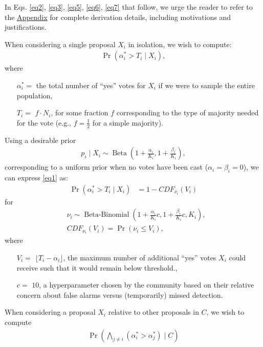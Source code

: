 \documentclass[format=acmsmall, review=true, screen=true, anonymous=true]{acmart}
\begin{document}
In Eqs. \eqref{eq2}, \eqref{eq3}, \eqref{eq5}, \eqref{eq6}, \eqref{eq7} that follow, we urge the reader to refer to the \hyperref[sec:derivation]{Appendix} for complete derivation details, including motivations and justifications.

When considering a single proposal $X_i$ in isolation, we wish to compute:
\begin{align}\label{eq1}
\Pr(\alpha^*_i > T_i \mid X_i),
\end{align}
where
\begin{itemize}
\item[$\alpha^*_i = $] the total number of ``yes'' votes for $X_i$ if we were to sample the entire population,
\item[$T_i = $] $f \cdot N_i$, for some fraction $f$ corresponding to the type of majority needed for the vote
(e.g., $f=\frac{1}{2}$ for a simple majority).
\end{itemize}
Using a desirable prior
\begin{align}\label{eq2}
p_i \mid X_i \sim \operatorname{Beta}(1+\frac{\alpha_i}{K_i},1+\frac{\beta_i}{K_i}),
\end{align}
corresponding to a uniform prior when no votes have been cast ($\alpha_i = \beta_i = 0$), we can express \eqref{eq1} as:
\begin{align}\label{eq3}
\Pr(\alpha^*_i > T_i \mid X_i) &= 1 - {CDF}_{\nu_i}(V_i)
\end{align}
for
\begin{align*}
&\nu_i \sim \operatorname{Beta-Binomial}(1 + \frac{\alpha_i}{K_i}c, 1 + \frac{\beta_i}{K_i}c, K_i),\\
&{CDF}_{\nu_i}(V_i)  = \Pr(\nu_i \leq V_i),
\end{align*}
where
\begin{itemize}
\item[$V_i = $] $\lfloor{T_i - \alpha_i}\rfloor$, the maximum number of additional ``yes'' votes $X_i$ could receive such that it would remain below threshold.,
\item[$c = $] $10$, a hyperparameter chosen by the community based on their relative concern about false alarms versus (temporarily) missed detection.
\end{itemize}

When considering a proposal $X_i$ relative to other proposals in $C$, we wish to compute
\begin{align}\label{eq4}
\Pr\left(\bigwedge_{j \neq i} (\alpha^*_i > \alpha^*_j) \mid C\right)
\end{align}
\end{document}
